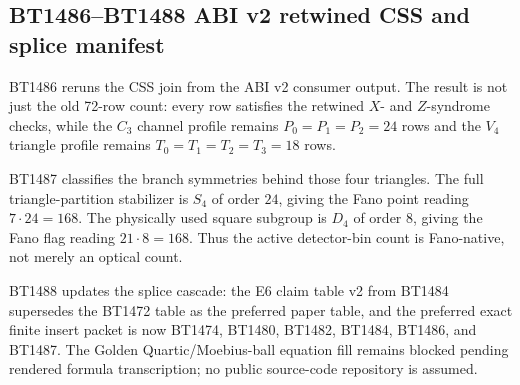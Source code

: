 \subsection{BT1486--BT1488 ABI v2 retwined CSS and splice manifest}
\label{sec:bt1486-bt1488-abi-v2-css-splice}

BT1486 reruns the CSS join from the ABI v2 consumer output.  The result is not
just the old 72-row count: every row satisfies the retwined \(X\)- and
\(Z\)-syndrome checks, while the \(C_3\) channel profile remains
\(P_0=P_1=P_2=24\) rows and the \(V_4\) triangle profile remains
\(T_0=T_1=T_2=T_3=18\) rows.

BT1487 classifies the branch symmetries behind those four triangles.  The full
triangle-partition stabilizer is \(S_4\) of order \(24\), giving the Fano point
reading \(7\cdot24=168\).  The physically used square subgroup is \(D_4\) of
order \(8\), giving the Fano flag reading \(21\cdot8=168\).  Thus the active
detector-bin count is Fano-native, not merely an optical count.

BT1488 updates the splice cascade: the E6 claim table v2 from BT1484 supersedes
the BT1472 table as the preferred paper table, and the preferred exact finite
insert packet is now BT1474, BT1480, BT1482, BT1484, BT1486, and BT1487.  The
Golden Quartic/Moebius-ball equation fill remains blocked pending rendered
formula transcription; no public source-code repository is assumed.
